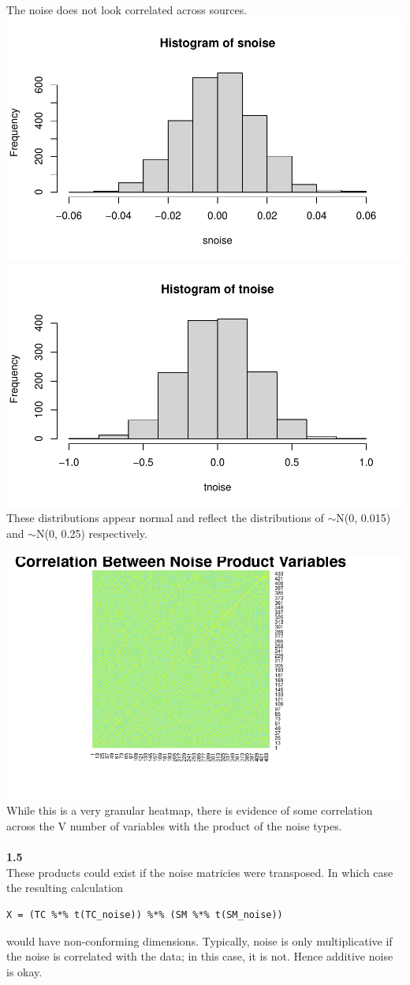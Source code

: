 \documentclass[11pt]{article}
\begin{document}
The noise does not look correlated across sources.\\
\includegraphics[width=.55\linewidth]{plots/hist_snoise.pdf}
\includegraphics[width=.55\linewidth]{plots/hist_tnoise.pdf}
\\
These distributions appear normal and reflect the distributions of $\sim$N(0, 0.015) and $\sim$N(0, 0.25) respectively.\\\\
\includegraphics[width=.75\linewidth]{plots/Product_noise_heatmap.pdf}
\\While this is a very granular heatmap, there is evidence of some correlation across the V number of variables with the product of the noise types.\\\\
\textbf{1.5}\\
These products could exist if the noise matricies were transposed. In which case the resulting calculation
\begin{lstlisting}
X = (TC %*% t(TC_noise)) %*% (SM %*% t(SM_noise))
\end{lstlisting} would have non-conforming dimensions. Typically, noise is only multiplicative if the noise is correlated with the data; in this case, it is not. Hence additive noise is okay. \\
\end{document}
